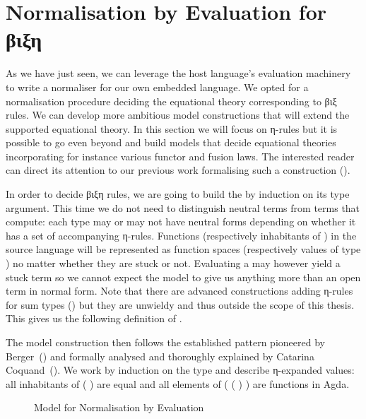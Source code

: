 \section{Normalisation by Evaluation for βιξη}
\label{normbye}

As we have just seen, we can leverage the host language's evaluation
machinery to write a normaliser for our own embedded language. We opted
for a normalisation procedure deciding the equational theory corresponding
to βιξ rules. We can develop more ambitious model constructions that will
extend the supported equational theory.
%
In this section we will focus on η-rules but it is possible to go even
beyond and build models that decide equational theories incorporating
for instance various functor and fusion laws. The interested reader can
direct its attention to our previous work formalising such a construction
(\citeyear{DBLP:conf/icfp/AllaisMB13}).

In order to decide βιξη rules, we are going to build the  by
induction on its type argument. This time we do not need to distinguish
neutral terms from terms that compute: each type may or may not have
neutral forms depending on whether it has a set of accompanying η-rules.
%
Functions (respectively inhabitants of ) in the source language
will be represented as function spaces (respectively values of type )
no matter whether they are stuck or not. Evaluating a  may however
yield a stuck term so we cannot expect the model to give us anything more than
an open term in normal form. Note that there are advanced constructions
adding η-rules for sum types
(\cite{DBLP:conf/tlca/Ghani95,DBLP:conf/flops/AltenkirchU04,DBLP:conf/tlca/Lindley07})
but they are unwieldy and thus outside the scope of this thesis.
This gives us the following definition of .


The model construction then follows the established pattern pioneered by
Berger~(\citeyear{berger1993program}) and formally analysed and thoroughly
explained by Catarina Coquand~(\citeyear{coquand2002formalised}). We work
by induction on the type and describe η-expanded values: all inhabitants
of (  ) are equal and all elements
of ( (  ) ) are functions in Agda.

\begin{figure}[h]
\caption{Model for Normalisation by Evaluation\label{fig:nbemodel}}
\end{figure}

